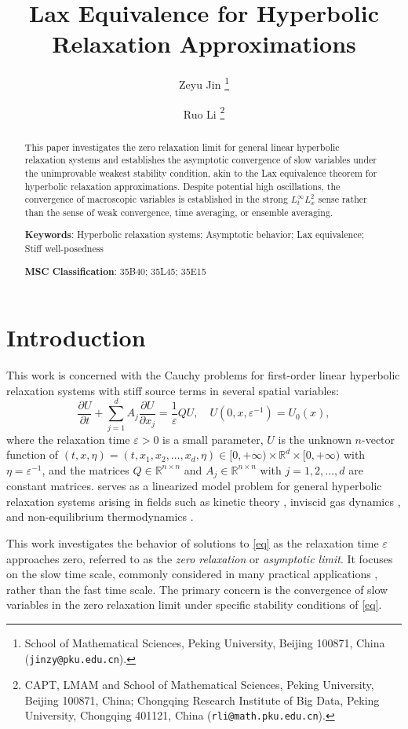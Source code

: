 \documentclass{article}
\title{Lax Equivalence for Hyperbolic Relaxation Approximations}
\author{Zeyu Jin \footnote{School of Mathematical Sciences, Peking University, Beijing 100871, China (\texttt{jinzy@pku.edu.cn}).} 
\and Ruo Li
\footnote{CAPT, LMAM and School of Mathematical Sciences, Peking University, Beijing 100871, China; Chongqing Research Institute of Big Data, Peking University, Chongqing 401121, China
(\texttt{rli@math.pku.edu.cn}).}}
\date{}
\theoremstyle{plain}%
\theoremstyle{definition}%
\theoremstyle{remark}%
\newcommand{\bR}{\mathbb{R}}
\newcommand{\+}[1]{{\bm{#1}}}
\newcommand{\eps}{\varepsilon}
\newcommand{\pd}[2]{\dfrac{\partial{#1}}{\partial{#2}}}
\begin{document}
\maketitle

\begin{abstract}
  This paper investigates the zero relaxation limit for general 
  linear hyperbolic relaxation systems and establishes the 
  asymptotic convergence of slow variables under the unimprovable 
  weakest stability condition, akin to the Lax equivalence theorem 
  for hyperbolic relaxation approximations.
  Despite potential high oscillations, the convergence of macroscopic 
  variables is established in the strong $L^\infty_t L^2_x$ sense 
  rather than the sense of weak convergence, time averaging, or 
  ensemble averaging.
  \newline

  \noindent \textbf{Keywords}: 
  Hyperbolic relaxation systems; 
  Asymptotic behavior;
  Lax equivalence;
  Stiff well-posedness
  \newline

  \noindent \textbf{MSC Classification}: 35B40; 35L45; 35E15
\end{abstract}

\section{Introduction}
This work is concerned with the Cauchy problems for first-order 
linear hyperbolic relaxation systems with stiff source terms in 
several spatial variables:
\begin{equation}\label{eq}
  \pd{U}{t} + \sum_{j = 1}^d A_j \pd{U}{x_j} = \frac{1}{\eps} Q U, 
  \quad U(0, x, \eps^{-1}) = U_0(x),
\end{equation}
where 
the relaxation time $\eps > 0$ is a small parameter, 
$U$ is the unknown $n$-vector function of 
$(t, x, \eta) = (t, x_1, x_2, \ldots, x_d, \eta) \in [0, +\infty) 
\times \bR^d \times [0, +\infty)$ with $\eta = \eps^{-1}$, and 
the matrices $Q \in \bR^{n \times n}$ and $A_j \in \bR^{n \times n}$ 
with $j = 1, 2, \ldots, d$ are constant matrices.
 serves as a linearized model problem for general hyperbolic 
relaxation systems arising in fields such as
kinetic theory \cite{Cercignani1994dilute,jin2023NMR,
Platkowski1988DVM}, 
inviscid gas dynamics \cite{Zeng1999gas}, and 
non-equilibrium thermodynamics \cite{Chapman1939nonuniform,
Muller1993extended,Muller1998rational}.

This work investigates the behavior of solutions to 
\cref{eq} as the relaxation time $\eps$ approaches zero, 
referred to as the \textit{zero relaxation} or 
\textit{asymptotic limit}. 
It focuses on the slow time scale, commonly considered in 
many practical applications \cite{Kreiss1980problems}, 
rather than the fast time scale.
The primary concern is the convergence of slow 
variables in the zero relaxation limit under specific stability 
conditions of \cref{eq}.
\end{document}
